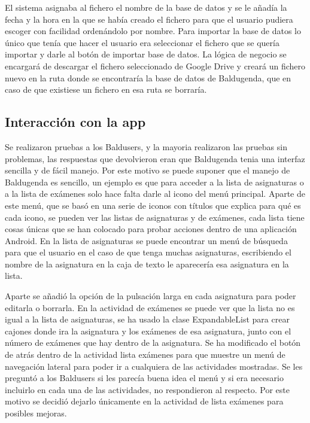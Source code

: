 El sistema asignaba al fichero el nombre de la base de datos y se le añadía la fecha y la hora en la que se había creado el fichero para que el usuario pudiera escoger con facilidad ordenándolo por nombre.
Para importar la base de datos lo único que tenía que hacer el usuario era seleccionar el fichero que se quería importar y darle al botón de importar base de datos.
La lógica de negocio se encargará de descargar el fichero seleccionado de Google Drive y creará un fichero nuevo en la ruta donde se encontraría la base de datos de Baldugenda, que en caso de que existiese un fichero en esa ruta se borraría.

\subsection{Interacción con la app}
\label{subsecc:Interacción con la app}

Se realizaron pruebas a los Baldusers, y la mayoria realizaron las pruebas sin problemas, las respuestas que devolvieron eran que Baldugenda tenia una interfaz sencilla y de fácil manejo. Por este motivo se puede suponer que el manejo de Baldugenda es sencillo, un ejemplo es que para acceder a la lista de asignaturas o a la lista de exámenes solo hace falta darle al icono del menú principal.
Aparte de este menú, que se basó en una serie de iconos con títulos que explica para qué es cada icono, se pueden ver las listas de asignaturas y de exámenes, cada lista tiene cosas únicas que se han colocado para probar acciones dentro de una aplicación Android.
En la lista de asignaturas se puede encontrar un menú de búsqueda para que el usuario en el caso de que tenga muchas asignaturas, escribiendo el nombre de la asignatura en la caja de texto le aparecería esa asignatura en la lista.

Aparte se añadió la opción de la pulsación larga en cada asignatura para poder editarla o borrarla.
En la actividad de exámenes se puede ver que la lista no es igual a la lista de asignaturas, se ha usado la clase ExpandableList para crear cajones donde ira la asignatura y los exámenes de esa asignatura, junto con el número de exámenes que hay dentro de la asignatura.
Se ha modificado el botón de atrás dentro de la actividad lista exámenes para que muestre un menú de navegación lateral para poder ir a cualquiera de las actividades mostradas. Se les preguntó a los Baldusers si les parecía buena idea el menú y si era necesario incluirlo en cada una de las actividades, no respondieron al respecto. Por este motivo se decidió dejarlo únicamente en la actividad de lista exámenes para posibles mejoras.
